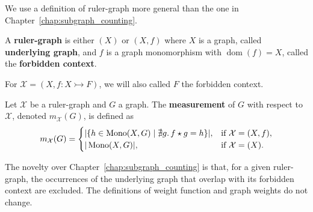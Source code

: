 
We use a definition of ruler-graph more general than the one in Chapter~\ref{chap:subgraph_counting}.

\begin{definition}
    \label{antipattern:def:ruler_graph}
    A \textbf{ruler-graph} is either $(X)$ or \( (X, f) \) where $X$ is a graph, called \textbf{underlying graph}, and $f$ is a graph monomorphism with $\operatorname{dom}(f) = X$, called the \textbf{forbidden context}.
\end{definition}
For $\mathcal{X} = (X, f:X \rightarrowtail F)$, we will also called $F$ the forbidden context.

\begin{definition}[Measurement]
    \label{antipattern:def:measurement}
    Let \( \mathcal{X}\) be a ruler-graph and \( G \) a graph. The \textbf{measurement} of \( G \) with respect to \( \mathcal{X}\), denoted \( m_\mathcal{X}(G) \), is defined as 
    \[
        m_\mathcal{X}(G) =
        \begin{cases}
            |\{h \in \operatorname{Mono}(X,G) \mid \nexists g.\,f \star g = h \}|, & \text{if } \mathcal{X} = (X, f), \\
            |\operatorname{Mono}(X,G)|, & \text{if } \mathcal{X} = (X).
        \end{cases}
    \]
\end{definition}
The novelty over Chapter~\ref{chap:subgraph_counting} is that, for a given ruler-graph, the occurrences of the underlying graph that overlap with its forbidden context are excluded. The definitions of weight function and graph weights do not change.
